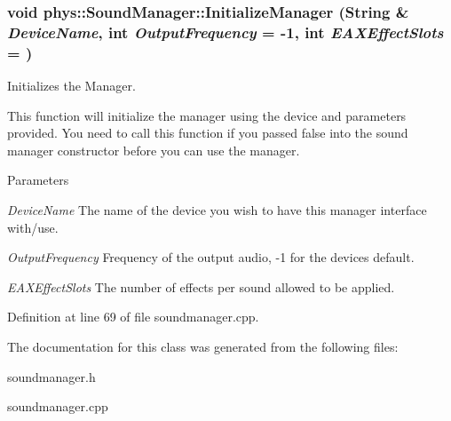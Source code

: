 \hypertarget{classphys_1_1SoundManager_aa0fc07170611851f3fa888c8e28d99df}{
\subsubsection[{InitializeManager}]{\setlength{\rightskip}{0pt plus 5cm}void phys::SoundManager::InitializeManager ({\bf String} \& {\em DeviceName}, \/  int {\em OutputFrequency} = {\ttfamily -\/1}, \/  int {\em EAXEffectSlots} = {})}}
\label{d1/dc4/classphys_1_1SoundManager_aa0fc07170611851f3fa888c8e28d99df}


Initializes the Manager. 

This function will initialize the manager using the device and parameters provided. You need to call this function if you passed false into the sound manager constructor before you can use the manager. 
\begin{DoxyParams}{Parameters}
\item[{\em DeviceName}]The name of the device you wish to have this manager interface with/use. \item[{\em OutputFrequency}]Frequency of the output audio, -\/1 for the devices default. \item[{\em EAXEffectSlots}]The number of effects per sound allowed to be applied. \end{DoxyParams}


Definition at line 69 of file soundmanager.cpp.



The documentation for this class was generated from the following files:\begin{DoxyCompactItemize}
\item 
soundmanager.h\item 
soundmanager.cpp\end{DoxyCompactItemize}
